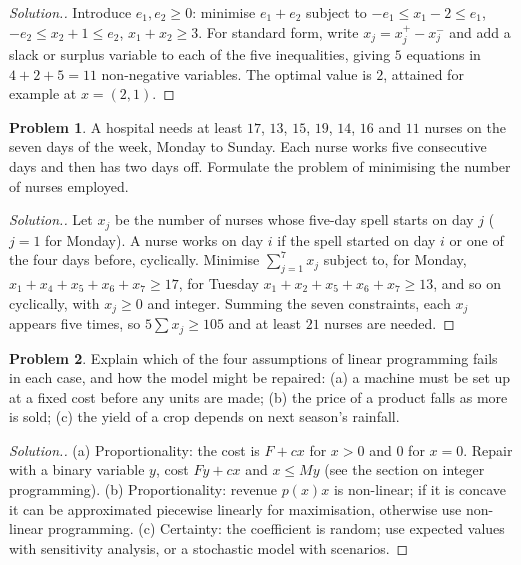 \documentclass[11pt,a4paper]{article}
\numberwithin{equation}{section}
\theoremstyle{definition}
\newtheorem{problemx}{Problem}[subsection]
\newenvironment{problem}{\begin{problemx}}{\end{problemx}}
\newenvironment{solution}
  {\renewcommand{\qedsymbol}{}\begin{proof}[\textit{Solution}.]}
  {\end{proof}}
\begin{document}
\begin{solution}
Introduce $e_1, e_2 \geq 0$: minimise $e_1 + e_2$ subject to $-e_1 \leq x_1 - 2 \leq e_1$, $-e_2 \leq x_2 + 1 \leq e_2$, $x_1 + x_2 \geq 3$. For standard form, write $x_j = x_j^+ - x_j^-$ and add a slack or surplus variable to each of the five inequalities, giving $5$ equations in $4 + 2 + 5 = 11$ non-negative
variables. The optimal value is $2$, attained for example at $x = (2, 1)$.
\end{solution}

\begin{problem}
A hospital needs at least $17$, $13$, $15$, $19$, $14$, $16$ and $11$ nurses on the seven days of the week, Monday to Sunday. Each nurse works five consecutive days and then has two days off. Formulate the problem of minimising the number of nurses employed.
\end{problem}

\begin{solution}
Let $x_j$ be the number of nurses whose five-day spell starts on day $j$ ($j = 1$ for Monday). A nurse works on day $i$ if the spell started on day $i$ or one of the four days before, cyclically. Minimise $\sum_{j = 1}^7x_j$ subject to, for Monday, $x_1 + x_4 + x_5 + x_6 + x_7 \geq 17$, for Tuesday
$x_1 + x_2 + x_5 + x_6 + x_7 \geq 13$, and so on cyclically, with $x_j \geq 0$ and integer. Summing the seven constraints, each $x_j$ appears five times, so $5\sum x_j \geq 105$ and at least $21$ nurses are needed.
\end{solution}

\begin{problem}
Explain which of the four assumptions of linear programming fails in each case, and how the model might be repaired: (a) a machine must be set up at a fixed cost before any units are made; (b) the price of a product falls as more is sold; (c) the yield of a crop depends on next season's rainfall.
\end{problem}

\begin{solution}
(a) Proportionality: the cost is $F + cx$ for $x > 0$ and $0$ for $x = 0$. Repair with a binary variable $y$, cost $Fy + cx$ and $x \leq My$ (see the section on integer programming). (b) Proportionality: revenue $p(x)x$ is non-linear; if it is concave it can be approximated piecewise linearly for maximisation, otherwise use
non-linear programming. (c) Certainty: the coefficient is random; use expected values with sensitivity analysis, or a stochastic model with scenarios.
\end{solution}
\end{document}
